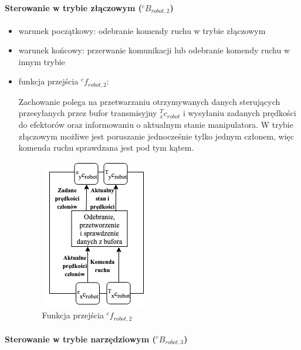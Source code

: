 \documentclass[a4paper, 12pt, twoside]{article}
\begin{document}
\paragraph{Sterowanie w trybie złączowym ($^cB_{robot,2}$)}

\begin{itemize} 
\item warunek początkowy: odebranie komendy ruchu w trybie złączowym
\item warunek końcowy: przerwanie komunikacji lub odebranie komendy ruchu w innym trybie
\item funkcja przejścia $^cf_{robot,2}$:

Zachowanie polega na przetwarzaniu otrzymywanych danych sterujących przesyłanych przez bufor transmisyjny $^T_xc_{robot}$ i wysyłaniu zadanych prędkości do efektorów oraz informowaniu o aktualnym stanie manipulatora. W trybie złączowym możliwe jest poruszanie jednocześnie tylko jednym członem, więc komenda ruchu sprawdzana jest pod tym kątem. 

\begin{figure}[hbt!]
\centering
\includegraphics[width=0.3\linewidth]{images/state_joint.png}
\caption{Funkcja przejścia $^cf_{robot,2}$ }
\label{fig:state_joint}
\end{figure}

\end{itemize}

\paragraph{Sterowanie w trybie narzędziowym ($^cB_{robot,3}$)}
\end{document}
